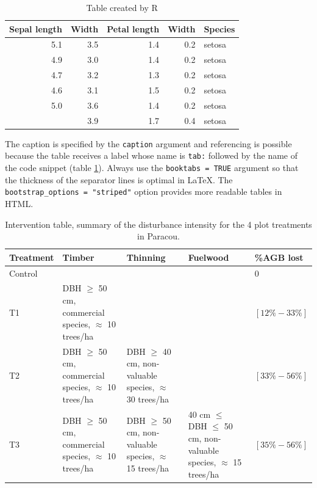 \documentclass[
  12pt,
  american,
  a4paper,
  extrafontsizes,onecolumn,openright
  ]{memoir}
\begin{document}
\begin{longtable}[t]{rrrrl}
\caption{\label{tab:kable}Table created by R}\\
\toprule
Sepal length & Width & Petal length & Width & Species\\
\midrule
5.1 & 3.5 & 1.4 & 0.2 & setosa\\
4.9 & 3.0 & 1.4 & 0.2 & setosa\\
4.7 & 3.2 & 1.3 & 0.2 & setosa\\
4.6 & 3.1 & 1.5 & 0.2 & setosa\\
5.0 & 3.6 & 1.4 & 0.2 & setosa\\
\addlinespace
5.4 & 3.9 & 1.7 & 0.4 & setosa\\
\bottomrule
\end{longtable}

\normalsize

The caption is specified by the \texttt{caption} argument and referencing is possible because the table receives a label whose name is \texttt{tab:} followed by the name of the code snippet (table \ref{tab:kable}).
Always use the \texttt{booktabs\ =\ TRUE} argument so that the thickness of the separator lines is optimal in LaTeX.
The \texttt{bootstrap\_options\ =\ "striped"} option provides more readable tables in HTML.



\scriptsize

\begin{table}
\centering
\caption{\label{tab:Paracou}Intervention table, summary of the disturbance intensity for the 4 plot treatments in Paracou.}
\centering
\begin{tabu} to 
\toprule
\textbf{Treatment} & \textbf{Timber} & \textbf{Thinning} & \textbf{Fuelwood} & \textbf{\%AGB lost}\\
\midrule
Control &  &  &  & 0\\
T1 & DBH $\geq$ 50 cm, commercial species, $\approx$ 10 trees/ha &  &  & $[12\%-33\%]$\\
T2 & DBH $\geq$ 50 cm, commercial species, $\approx$ 10 trees/ha & DBH $\geq$ 40 cm, non-valuable species, $\approx$ 30 trees/ha &  & $[33\%-56\%]$\\
T3 & DBH $\geq$ 50 cm, commercial species, $\approx$ 10 trees/ha & DBH $\geq$ 50 cm, non-valuable species, $\approx$ 15 trees/ha & 40 cm $\leq$ DBH $\leq$ 50 cm, non-valuable species, $\approx$ 15 trees/ha & $[35\%-56\%]$\\
\bottomrule
\end{tabu}
\end{table}
\end{document}
